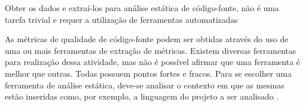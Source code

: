 Obter os dados e extraí-los para análise estática de código-fonte, não é uma tarefa trivial e requer a utilização de ferramentas automatizadas \cite[pág.~2]{meirelles2013}

As métricas de qualidade de código-fonte podem ser obtidas através do uso de uma ou mais ferramentas de extração de métricas. Existem diversas ferramentas para realização dessa atividade, mas não é possível afirmar que uma ferramenta é melhor que outras. Todas possuem pontos fortes e fracos. Para se escolher uma ferramenta de análise estática, deve-se analisar o contexto em que as mesmas estão inseridas como, por exemplo, a linguagem do projeto a ser analisado \cite{millani2013}.